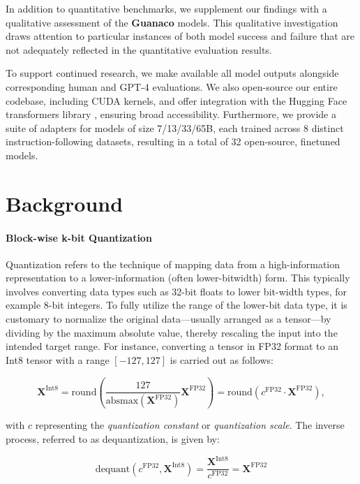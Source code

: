 In addition to quantitative benchmarks, we supplement our findings with a qualitative assessment of the \textbf{Guanaco} models. This qualitative investigation draws attention to particular instances of both model success and failure that are not adequately reflected in the quantitative evaluation results.

To support continued research, we make available all model outputs alongside corresponding human and GPT-4 evaluations. We also open-source our entire codebase, including CUDA kernels, and offer integration with the Hugging Face transformers library \citep{wolf2019huggingface}, ensuring broad accessibility. Furthermore, we provide a suite of adapters for models of size 7/13/33/65B, each trained across 8 distinct instruction-following datasets, resulting in a total of 32 open-source, finetuned models.

\section{Background}
\paragraph{Block-wise k-bit Quantization} Quantization refers to the technique of mapping data from a high-information representation to a lower-information (often lower-bitwidth) form. This typically involves converting data types such as 32-bit floats to lower bit-width types, for example 8-bit integers. To fully utilize the range of the lower-bit data type, it is customary to normalize the original data—usually arranged as a tensor—by dividing by the maximum absolute value, thereby rescaling the input into the intended target range. For instance, converting a tensor in FP32 format to an Int8 tensor with a range $[-127, 127]$ is carried out as follows:

\begin{equation}
    \mathbf{X}^{ \text{Int8}} = \text{round}\left( \frac{127}{{\text{absmax}}(\mathbf{X}^{{\text{FP32}}})}\mathbf{X}^{{\text{FP32}}} \right) = \text{round}(c^{\text{FP32}}\cdot \mathbf{X}^{{\text{FP32}}}),
\end{equation}

with $c$ representing the {\em quantization constant} or {\em quantization scale}. The inverse process, referred to as dequantization, is given by:

\begin{equation}
    \text{dequant}(c^{\text{FP32}}, \mathbf{X}^{\text{Int8}}) = \frac{\mathbf{X}^{\text{Int8}}}{c^{\text{FP32}}} = \mathbf{X}^{\text{FP32}}
\end{equation}

